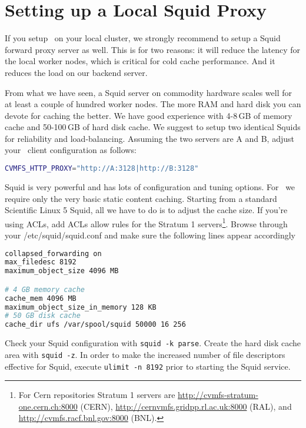 \chapter{Setting up a Local Squid Proxy}
\label{sct:squid}

If you setup \cvmfs\ on your local cluster, we strongly recommend to setup a Squid forward proxy server as well.
This is for two reasons: it will reduce the latency for the local worker nodes, which is critical for cold cache performance. 
And it reduces the load on our backend server.

From what we have seen, a Squid server on commodity hardware scales well for at least a couple of hundred worker nodes.
The more RAM and hard disk you can devote for caching the better.
We have good experience with 4-8\,GB of memory cache and 50-100\,GB of hard disk cache.
We suggest to setup two identical Squids for reliability and load-balancing.
Assuming the two servers are A and B, adjust your \cvmfs\ client configuration as follows:
\begin{lstlisting}[language=bash]
CVMFS_HTTP_PROXY="http://A:3128|http://B:3128"
\end{lstlisting}

Squid is very powerful and has lots of configuration and tuning options.
For \cvmfs\ we require only the very basic static content caching.
Starting from a standard Scientific Linux 5 Squid, all we have to do is to adjust the cache size.
If you're using ACLs, add ACLs allow rules for the Stratum 1 servers\footnote{For Cern repositories Stratum 1 servers are \url{http://cvmfs-stratum-one.cern.ch:8000} (CERN), \url{http://cernvmfs.gridpp.rl.ac.uk:8000} (RAL), and \url{http://cvmfs.racf.bnl.gov:8000} (BNL).}.
Browse through your /etc/squid/squid.conf and make sure the following lines appear accordingly
\begin{lstlisting}[language=bash]
collapsed_forwarding on
max_filedesc 8192
maximum_object_size 4096 MB

# 4 GB memory cache
cache_mem 4096 MB
maximum_object_size_in_memory 128 KB
# 50 GB disk cache
cache_dir ufs /var/spool/squid 50000 16 256
\end{lstlisting}

Check your Squid configuration with \texttt{squid -k parse}.
Create the hard disk cache area with \texttt{squid -z}.
In order to make the increased number of file descriptors effective for Squid, execute \texttt{ulimit -n 8192} prior to starting the Squid service.
